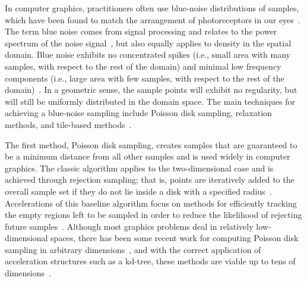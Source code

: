 In computer graphics, practitioners often use blue-noise distributions of samples, which have been found to match the arrangement of photoreceptors in our eyes~\cite{Yellott1982}.
%
The term blue noise comes from signal processing and relates to the power spectrum of the noise signal~\cite{Tuzlukov2002}, but also equally applies to density in the spatial domain.
%
Blue noise exhibits no concentrated spikes (i.e., small area with many samples, with respect to the rest of the domain) and minimal low frequency components (i.e., large area with few samples, with respect to the rest of the domain)~\cite{YanGuoWang2015}.
%
In a geometric sense, the sample points will exhibit no regularity, but will still be uniformly distributed in the domain space.
%
The main techniques for achieving a blue-noise sampling include Poisson disk sampling, relaxation methods, and tile-based methods~\cite{YanGuoWang2015}.

The first method, Poisson disk sampling, creates samples that are guaranteed to be a minimum distance from all other samples and is used widely in computer graphics.
%
The classic algorithm applies to the two-dimensional case and is achieved through rejection sampling; that is, points are iteratively added to the overall sample set if they do not lie inside a disk with a specified radius~\cite{Cook1986}.
%
Accelerations of this baseline algorithm focus on methods for efficiently tracking the empty regions left to be sampled in order to reduce the likelihood of rejecting future samples~\cite{EbeidaDavidsonPatney2011,EbeidaMitchellPatney2012,GamitoMaddock2009,Jones2006,JonesKarger2011,WhiteClineEgbert2007}.
%
Although most graphics problems deal in relatively low-dimensional spaces, there has been some recent work for computing Poisson disk sampling in arbitrary dimensions~\cite{Bridson2007,EbeidaMitchellPatney2012,EbeidaMitchellPatney2015,GamitoMaddock2009,MitchellEbeidaAwad2018}, and with the correct application of acceleration structures such as a kd-tree, these methods are viable up to tens of dimensions~\cite{MitchellEbeidaAwad2018}.

